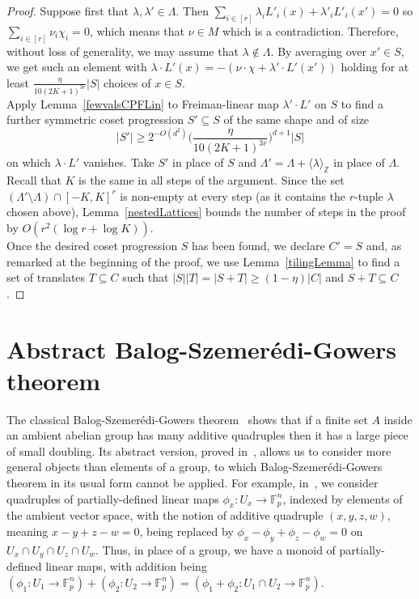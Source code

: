 \documentclass[a4paper,11pt]{article}
\numberwithin{theorem}{section}
\theoremstyle{definition}
\begin{document}
\begin{proof}
Suppose first that $\lambda, \lambda' \in \Lambda$. Then $\sum_{i \in [r]} \lambda_i L'_i(x) + \lambda'_i L'_i(x') = 0$ so $\sum_{i \in [r]} \nu_i \chi_i = 0$, which means that $\nu \in M$ which is a contradiction. Therefore, without loss of generality, we may assume that $\lambda \notin \Lambda$. By averaging over $x' \in S$, we get such an element with $\lambda\cdot  L'(x) = -(\nu \cdot \chi + \lambda'\cdot  L'(x'))$ holding for at least $\frac{\eta}{10 (2K + 1)^{3r}}|S|$ choices of $x \in S$.\\
\indent Apply Lemma~\ref{fewvalsCPFLin} to Freiman-linear map $\lambda' \cdot L'$ on $S$ to find a further symmetric coset progression $S' \subseteq S$ of the same shape and of size 
\[|S'| \geq 2^{-O(d^2)}\Big(\frac{\eta}{10 (2K + 1)^{3r}}\Big)^{d+1} |S|\]
on which $\lambda \cdot L'$ vanishes. Take $S'$ in place of $S$ and $\Lambda' = \Lambda + \langle \lambda \rangle_{\mathbb{Z}}$ in place of $\Lambda$.\\

\indent Recall that $K$ is the same in all steps of the argument. Since the set $(\Lambda' \setminus \Lambda) \cap [-K, K]^r$ is non-empty at every step (as it contains the $r$-tuple $\lambda$ chosen above), Lemma~\ref{nestedLattices} bounds the number of steps in the proof by $O(r^2(\log r + \log K))$.\\

Once the desired coset progression $S$ has been found, we declare $C' = S$ and, as remarked at the beginning of the proof, we use Lemma~\ref{tilingLemma} to find a set of translates $T \subseteq C$ such that $|S||T| = |S + T| \geq (1 - \eta) |C|$ and $S + T \subseteq C$.\end{proof}

\section{Abstract Balog-Szemer\'edi-Gowers theorem}\label{absbsgsection}

The classical Balog-Szemer\'edi-Gowers theorem~\cite{BalogSzem, Gow4AP} shows that if a finite set $A$ inside an ambient abelian group has many additive quadruples then it has a large piece of small doubling. Its abstract version, proved in~\cite{newU4}, allows us to consider more general objects than elements of a group, to which Balog-Szemer\'edi-Gowers theorem in its usual form cannot be applied. For example, in~\cite{newU4}, we consider quadruples of partially-defined linear maps $\phi_x : U_x \to \mathbb{F}_p^n$, indexed by elements of the ambient vector space, with the notion of additive quadruple $(x, y, z, w)$, meaning $x - y + z - w = 0$, being replaced by $\phi_x - \phi_y + \phi_z - \phi_w = 0$ on $U_x \cap U_y \cap U_z \cap U_w$. Thus, in place of a group, we have a monoid of partially-defined linear maps, with addition being $(\phi_1: U_1 \to \mathbb{F}_p^n) + (\phi_2: U_2 \to \mathbb{F}_p^n)= (\phi_1 + \phi_2: U_1 \cap  U_2 \to \mathbb{F}_p^n)$.\\
\end{document}
